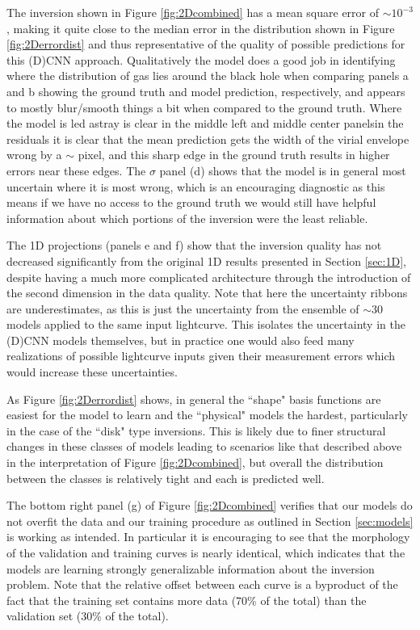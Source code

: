 \documentclass[floatfix,twocolumn,trackchanges,linenumbers]{aastex7}
\begin{document}
The inversion shown in Figure \ref{fig:2Dcombined} has a mean square error of $\sim 10^{-3}$, making it quite close to the median error in the distribution shown in Figure \ref{fig:2Derrordist} and thus representative of the quality of possible predictions for this (D)CNN approach. Qualitatively the model does a good job in identifying where the distribution of gas lies around the black hole when comparing panels a and b showing the ground truth and model prediction, respectively, and appears to mostly blur/smooth things a bit when compared to the ground truth.  Where the model is led astray is clear in the middle left and middle center panels\textemdash in the residuals it is clear that the mean prediction gets the width of the virial envelope wrong by a $\sim$ pixel, and this sharp edge in the ground truth results in higher errors near these edges. The $\sigma$ panel (d) shows that the model is in general most uncertain where it is most wrong, which is an encouraging diagnostic as this means if we have no access to the ground truth we would still have helpful information about which portions of the inversion were the least reliable.

The 1D projections (panels e and f) show that the inversion quality has not decreased significantly from the original 1D results presented in Section \ref{sec:1D}, despite having a much more complicated architecture through the introduction of the second dimension in the data quality. Note that here the uncertainty ribbons are underestimates, as this is just the uncertainty from the ensemble of $\sim 30$ models applied to the same input lightcurve. This isolates the uncertainty in the (D)CNN models themselves, but in practice one would also feed many realizations of possible lightcurve inputs given their measurement errors which would increase these uncertainties. 

As Figure \ref{fig:2Derrordist} shows, in general the ``shape" basis functions are easiest for the model to learn and the ``physical" models the hardest, particularly in the case of the ``disk" type inversions. This is likely due to finer structural changes in these classes of models leading to scenarios like that described above in the interpretation of Figure \ref{fig:2Dcombined}, but overall the distribution between the classes is relatively tight and each is predicted well. 

The bottom right panel (g) of Figure \ref{fig:2Dcombined} verifies that our models do not overfit the data and our training procedure as outlined in Section \ref{sec:models} is working as intended. In particular it is encouraging to see that the morphology of the validation and training curves is nearly identical, which indicates that the models are learning strongly generalizable information about the inversion problem. Note that the relative offset between each curve is a byproduct of the fact that the training set contains more data (70\% of the total) than the validation set (30\% of the total). 
\end{document}
